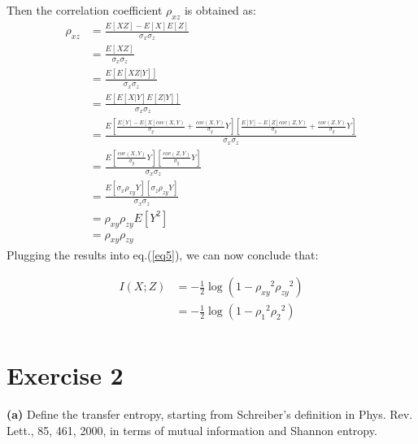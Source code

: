 \documentclass[11pt]{article}
\makeatletter
\newenvironment{proofw}{\par
	\pushQED{\qed}%
	\normalfont \topsep6\p@\@plus6\p@\relax
	\trivlist
	\item[]\ignorespaces
}{%
	\popQED\endtrivlist\@endpefalse
}
\makeatother
\begin{document}
\begin{proofw}
\pagebreak
Then the correlation coefficient $\rho_{xz}$ is obtained as:
\begin{equation*}
\begin{split}
\rho_{xz} & = \frac{E[XZ]-E[X]E[Z]}{\sigma_{x}\sigma_{z}}\\
		  & =\frac{E[XZ]}{\sigma_{x}\sigma_{z}}\\
		  & =\frac{E[E[XZ|Y]]}{\sigma_{x}\sigma_{z}}\\
		  & =\frac{E [E[X|Y] E[Z|Y]]}{\sigma_{x}\sigma_{z} }\\
		  & =\frac{E[\frac{E[Y]-E[X]cov(X,Y)}{\sigma_{y}} + \frac{cov(X,Y)}{\sigma_{y}}Y][\frac{E[Y]-E[Z]cov(Z,Y)}{\sigma_{y}}+ \frac{cov (Z,Y)}{\sigma_{y}}Y] } {\sigma_{x}\sigma_{z}}\\
		  & =\frac{E[ \frac{cov(X,Y)}{\sigma_{y}}Y][\frac{cov (Z,Y)}{\sigma_{y}}Y]} {\sigma_{x}\sigma_{z}}\\
		  &=\frac{E[\sigma_{x}\rho_{xy}Y][\sigma_{z}\rho_{zy}Y]}{\sigma_{x}\sigma_{z}}\\
		  &=\rho_{xy}\rho_{zy}E[{Y}^{2}]\\
		  &=\rho_{xy}\rho_{zy}
\end{split}
\end{equation*}
Plugging the results into eq.(\ref{eq5}), we can now conclude that:

\begin{equation*}
\begin{split}
I(X;Z) & =  -\frac{1}{2}\log	(1 - {\rho_{xy}}^2{\rho_{zy}}^2)\\
	& =  -\frac{1}{2}\log	(1 - {\rho_{1}}^2{\rho_{2}}^2)\\
\end{split}
\end{equation*}
\end{proofw}
\pagebreak

\section{Exercise 2}
\begin{tcolorbox}
\textbf{(a)}
Define the transfer entropy, starting from Schreiber’s definition in
Phys. Rev. Lett., 85, 461, 2000, in terms of mutual information and Shannon
entropy.
\end{tcolorbox}
\end{document}
